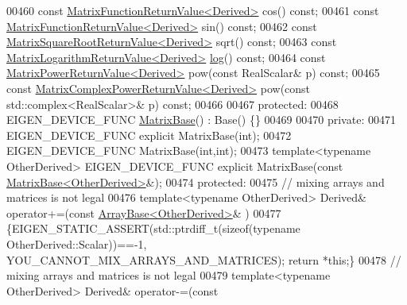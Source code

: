 \begin{DoxyCode}
00460     \textcolor{keyword}{const} \hyperlink{class_eigen_1_1_matrix_function_return_value}{MatrixFunctionReturnValue<Derived>} cos() \textcolor{keyword}{const};
00461     \textcolor{keyword}{const} \hyperlink{class_eigen_1_1_matrix_function_return_value}{MatrixFunctionReturnValue<Derived>} sin() \textcolor{keyword}{const};
00462     \textcolor{keyword}{const} \hyperlink{class_eigen_1_1_matrix_square_root_return_value}{MatrixSquareRootReturnValue<Derived>} sqrt() \textcolor{keyword}{const};
00463     \textcolor{keyword}{const} \hyperlink{class_eigen_1_1_matrix_logarithm_return_value}{MatrixLogarithmReturnValue<Derived>} 
      \hyperlink{structlog}{log}() \textcolor{keyword}{const};
00464     \textcolor{keyword}{const} \hyperlink{class_eigen_1_1_matrix_power_return_value}{MatrixPowerReturnValue<Derived>} pow(\textcolor{keyword}{const} RealScalar& p) \textcolor{keyword}{const};
00465     \textcolor{keyword}{const} \hyperlink{class_eigen_1_1_matrix_complex_power_return_value}{MatrixComplexPowerReturnValue<Derived>} pow(\textcolor{keyword}{const} 
      std::complex<RealScalar>& p) \textcolor{keyword}{const};
00466 
00467   \textcolor{keyword}{protected}:
00468     EIGEN\_DEVICE\_FUNC \hyperlink{group___core___module_class_eigen_1_1_matrix_base}{MatrixBase}() : Base() \{\}
00469 
00470   \textcolor{keyword}{private}:
00471     EIGEN\_DEVICE\_FUNC \textcolor{keyword}{explicit} MatrixBase(\textcolor{keywordtype}{int});
00472     EIGEN\_DEVICE\_FUNC MatrixBase(\textcolor{keywordtype}{int},\textcolor{keywordtype}{int});
00473     \textcolor{keyword}{template}<\textcolor{keyword}{typename} OtherDerived> EIGEN\_DEVICE\_FUNC \textcolor{keyword}{explicit} MatrixBase(\textcolor{keyword}{const} 
      \hyperlink{group___core___module_class_eigen_1_1_matrix_base}{MatrixBase<OtherDerived>}&);
00474   \textcolor{keyword}{protected}:
00475     \textcolor{comment}{// mixing arrays and matrices is not legal}
00476     \textcolor{keyword}{template}<\textcolor{keyword}{typename} OtherDerived> Derived& operator+=(\textcolor{keyword}{const} 
      \hyperlink{group___core___module_class_eigen_1_1_array_base}{ArrayBase<OtherDerived>}& )
00477     \{EIGEN\_STATIC\_ASSERT(std::ptrdiff\_t(\textcolor{keyword}{sizeof}(\textcolor{keyword}{typename} OtherDerived::Scalar))==-1,
      YOU\_CANNOT\_MIX\_ARRAYS\_AND\_MATRICES); \textcolor{keywordflow}{return} *\textcolor{keyword}{this};\}
00478     \textcolor{comment}{// mixing arrays and matrices is not legal}
00479     \textcolor{keyword}{template}<\textcolor{keyword}{typename} OtherDerived> Derived& operator-=(\textcolor{keyword}{const} 

\end{DoxyCode}
